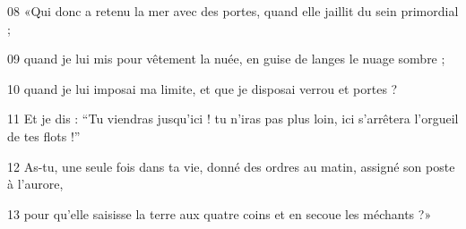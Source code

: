 
08 «Qui donc a retenu la mer avec des portes, quand elle jaillit du sein primordial ;

09 quand je lui mis pour vêtement la nuée, en guise de langes le nuage sombre ;

10 quand je lui imposai ma limite, et que je disposai verrou et portes ?

11 Et je dis : “Tu viendras jusqu’ici ! tu n’iras pas plus loin, ici s’arrêtera l’orgueil de tes flots !”

12 As-tu, une seule fois dans ta vie, donné des ordres au matin, assigné son poste à l’aurore,

13 pour qu’elle saisisse la terre aux quatre coins et en secoue les méchants ?»
